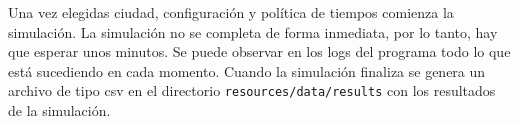 Una vez elegidas ciudad, configuración y política de tiempos comienza la simulación. La simulación no se completa de forma inmediata, por lo tanto, hay que esperar unos minutos. Se puede observar en los logs del programa todo lo que está sucediendo en cada momento. Cuando la simulación finaliza se genera un archivo de tipo \acrshort{csv} en el directorio \lstinline{resources/data/results} con los resultados de la simulación.